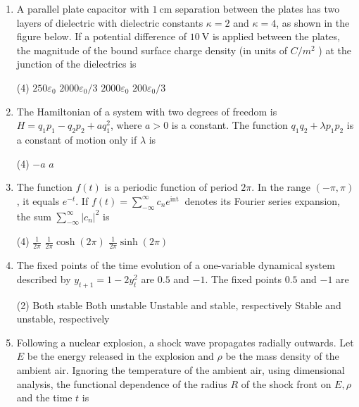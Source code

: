 \begin{enumerate}
\begin{tasks}
\end{tasks}
\item A parallel plate capacitor with $1 \mathrm{~cm}$ separation between the plates has two layers of dielectric with dielectric constants $\kappa=2$ and $\kappa=4$, as shown in the figure below. If a potential difference of $10 \mathrm{~V}$ is applied between the plates, the magnitude of the bound surface charge density (in units of $C / m^{2}$ ) at the junction of the dielectrics is
 \begin{tasks}(4)
	\task[\textbf{a.}]$250 \varepsilon_{0}$
	\task[\textbf{b.}]$2000 \varepsilon_{0} / 3$
	\task[\textbf{c.}] $2000 \varepsilon_{0}$
	\task[\textbf{d.}] $200 \varepsilon_{0} / 3$
\end{tasks}
\item The Hamiltonian of a system with two degrees of freedom is $H=q_{1} p_{1}-q_{2} p_{2}+a q_{1}^{2}$, where $a>0$ is a constant. The function $q_{1} q_{2}+\lambda p_{1} p_{2}$ is a constant of motion only if $\lambda$ is
 \begin{tasks}(4)
	\task[\textbf{c.}]$-a$
	\task[\textbf{d.}] $a$
\end{tasks}
\item The function $f(t)$ is a periodic function of period $2 \pi$. In the range $(-\pi, \pi)$, it equals $e^{-t}$. If $f(t)=\sum_{-\infty}^{\infty} c_{n} e^{\text {int }}$ denotes its Fourier series expansion, the sum $\sum_{-\infty}^{\infty}\left|c_{n}\right|^{2}$ is
 \begin{tasks}(4)
	\task[\textbf{b.}]$\frac{1}{2 \pi}$
	\task[\textbf{c.}] $\frac{1}{2 \pi} \cosh (2 \pi)$
	\task[\textbf{d.}] $\frac{1}{2 \pi} \sinh (2 \pi)$
\end{tasks}
\item The fixed points of the time evolution of a one-variable dynamical system described by $y_{t+1}=1-2 y_{t}^{2}$ are $0.5$ and $-1$. The fixed points $0.5$ and $-1$ are
 \begin{tasks}(2)
	\task[\textbf{a.}]Both stable
	\task[\textbf{b.}] Both unstable
	\task[\textbf{c.}] Unstable and stable, respectively
	\task[\textbf{d.}] Stable and unstable, respectively
\end{tasks}
\item Following a nuclear explosion, a shock wave propagates radially outwards. Let $E$ be the energy released in the explosion and $\rho$ be the mass density of the ambient air. Ignoring the temperature of the ambient air, using dimensional analysis, the functional dependence of the radius $R$ of the shock front on $E, \rho$ and the time $t$ is

\end{enumerate}
